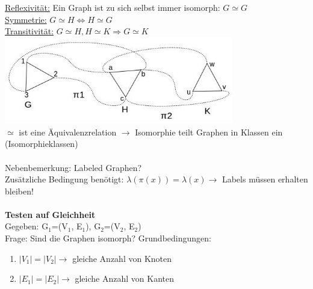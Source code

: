 \underline{Reflexivität:} Ein Graph ist zu sich selbst immer isomorph: $G \simeq G$\\
\underline{Symmetrie:} $G \simeq H \Leftrightarrow H \simeq G$\\
\underline{Transitivität:} $G \simeq H, H \simeq K \Rightarrow G \simeq K$\\
\includegraphics[width=0.75\textwidth]{lectures/161014/pix/7.jpg}
\\
$\simeq$ ist eine Äquivalenzrelation $\rightarrow$ Isomorphie teilt Graphen in Klassen ein (Isomorphieklassen)
\\\\
Nebenbemerkung: Labeled Graphen?\\
Zusätzliche Bedingung benötigt: $\lambda(\pi(x))=\lambda(x) \rightarrow$ Labels müssen erhalten bleiben!
\\\\
\textbf{Testen auf Gleichheit}\\
Gegeben: G$_1$=(V$_1$, E$_1$), G$_2$=(V$_2$, E$_2$)\\
Frage: Sind die Graphen isomorph?
\newpage
Grundbedingungen:
\begin{enumerate}
	\item $|V_1| = |V_2| \rightarrow$ gleiche Anzahl von Knoten
	\item $|E_1| = |E_2| \rightarrow$ gleiche Anzahl von Kanten
\end{enumerate}

